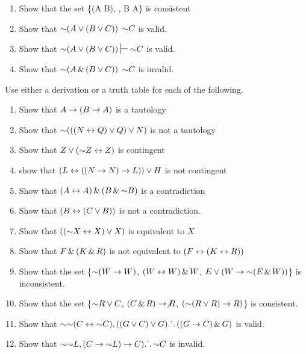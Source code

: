 {\begin{enumerate}[label=(\arabic*)]



\item Show that the set \{\enot(A \eor B), , B \eif A\} is consistent
\item Show that $\mathord{\sim}(A \vee (B \vee C)) $ \therefore $ \mathord{\sim}{C}$ is valid.
\item Show that $\enot(A \eor (B \eor C)) \sststile{}{}  \enot{C}$ is valid.



\item Show that $\mathord{\sim}(A \,\&\, (B \vee C))$ \therefore $ \mathord{\sim}{C}$ is invalid. 
\end{enumerate}


\noindent\problempart Use either a derivation or a truth table for each of the following. 
\begin{enumerate}[label=(\arabic*)]
\item Show that $A \rightarrow (B \rightarrow A)$ is a tautology
\item Show that $\mathord{\sim} (((N \leftrightarrow Q) \vee Q) \vee N)$ is not a tautology
\item Show that $ Z \vee (\mathord{\sim} Z \leftrightarrow Z) $ is contingent
\item show that $ (L \leftrightarrow ((N \rightarrow N) \rightarrow L)) \vee H $ is not contingent
\item Show that $ (A \leftrightarrow A) \,\&\, (B \,\&\, \mathord{\sim} B)$ is a contradiction
\item Show that $ (B \leftrightarrow (C \vee B)) $ is not a contradiction.
\item Show that $ ((\mathord{\sim} X \leftrightarrow X) \vee X) $ is equivalent to $X$
\item Show that $F \,\&\, (K \,\&\, R) $ is not equivalent to $ (F \leftrightarrow (K \leftrightarrow R)) $
\item Show that the set \{$ \mathord{\sim} (W \rightarrow W)$, $(W \leftrightarrow W) \,\&\, W$, $E \vee (W \rightarrow \mathord{\sim} (E \,\&\, W))$\} is inconsistent.
\item Show that the set  \{$\mathord{\sim} R \vee C $, $(C \,\&\, R) \rightarrow \not R$, $(\mathord{\sim} (R \vee R) \rightarrow R) $\} is consistent.
\item Show that $\mathord{\sim} \mathord{\sim} (C \leftrightarrow \mathord{\sim} C), ((G \vee C) \vee G) \ldotp\dot{}\,\ldotp ((G \rightarrow C) \,\&\, G) $ is valid.
\item Show that $ \mathord{\sim} \mathord{\sim} L,  (C \rightarrow \mathord{\sim} L) \rightarrow C) \ldotp\dot{}\,\ldotp \mathord{\sim} C$ is invalid. 
\end{enumerate}


}
